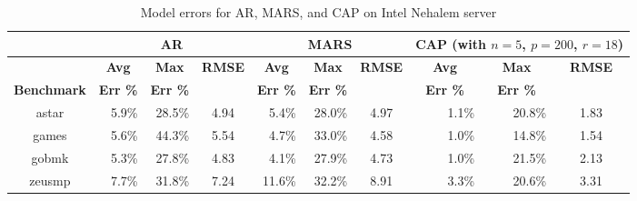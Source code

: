 \documentclass[times,10pt,finalversion]{usetex-v1}
\begin{document}
\begin{small}
{\setlength{\abovedisplayskip}{0pt plus 0pt minus 0pt}
 \setlength{\belowdisplayskip}{0pt plus 0pt minus 0pt}
\begin{table}[tbp]
  \centering
    \caption{Model errors for AR, MARS, and CAP on Intel Nehalem server}
    \label{tab:modelerroroptIntel}
    \begin{tabular}[phtb]{c |r r c|r r c|r r c}
      \hline
      \multicolumn{1}{c|}{}&\multicolumn{3}{c|}{\small{\textbf{AR}}}&\multicolumn{3}{c|}{\small{\textbf{MARS}}}&\multicolumn{3}{c}{\small{\textbf{CAP} (with $n=5$,
            $p=200$, $r=18$)}}\\
        \hline
  &\multicolumn{1}{c}{\small{\textbf{Avg}}}&\multicolumn{1}{c}{\small{\textbf{Max}}}&\multicolumn{1}{c|}{\small{\textbf{RMSE}}}&\multicolumn{1}{c}{\small{\textbf{Avg}}}&\multicolumn{1}{c}{\small{\textbf{Max}}}&\multicolumn{1}{c|}{\small{\textbf{RMSE}}}&\multicolumn{1}{c}{\small{\textbf{Avg}}}&\multicolumn{1}{c}{\small{\textbf{Max}}}&\multicolumn{1}{c}{\small{\textbf{RMSE}}}\\
\multicolumn{1}{c|}{\small{\textbf{Benchmark}}}&\multicolumn{1}{c}{\small{\textbf{Err \%}}}&\multicolumn{1}{c}{\small{\textbf{Err \%}}}&\multicolumn{1}{c|}{}&\multicolumn{1}{c}{\small{\textbf{Err \%}}}&\multicolumn{1}{c}{\small{\textbf{Err \%}}}&\multicolumn{1}{c|}{\small{\textbf{}}}&\multicolumn{1}{c}{\small{\textbf{Err \%}}}&\multicolumn{1}{c}{\small{\textbf{Err \%}}}&\multicolumn{1}{c}{}\\
      \hline
      \small{astar }&\small{5.9\%}&\small{28.5\%}&\small{4.94}&\small{5.4\%}&\small{28.0\%}&\small{4.97}&\small{1.1\%}&\small{20.8\%}&\small{1.83}\\
      \small{games }&\small{5.6\%}&\small{44.3\%}&\small{5.54}&\small{4.7\%}&\small{33.0\%}&\small{4.58}&\small{1.0\%}&\small{14.8\%}&\small{1.54}\\
      \small{gobmk }&\small{5.3\%}&\small{27.8\%}&\small{4.83}&\small{4.1\%}&\small{27.9\%}&\small{4.73}&\small{1.0\%}&\small{21.5\%}&\small{2.13}\\
      \small{zeusmp}&\small{7.7\%}&\small{31.8\%}&\small{7.24}&\small{11.6\%}&\small{32.2\%}&\small{8.91}&\small{3.3\%}&\small{20.6\%}&\small{3.31}\\
      \hline
    \end{tabular}
  \end{table}
}
\end{small}
\end{document}
